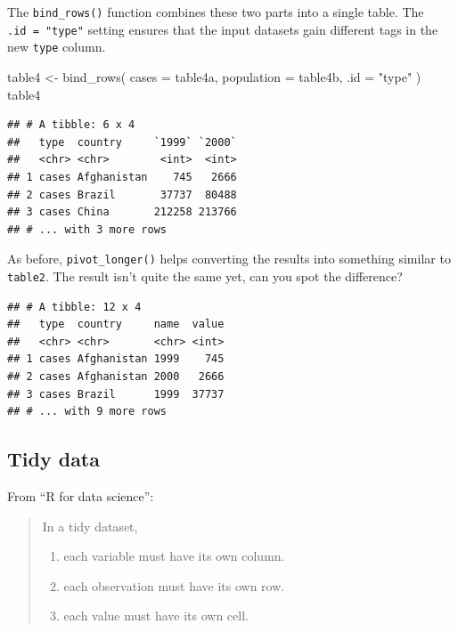 \documentclass[]{book}
\newenvironment{Shaded}{}{}
\newcommand{\DataTypeTok}[1]{#1}
\newcommand{\KeywordTok}[1]{\textcolor[rgb]{0.00,0.00,1.00}{#1}}
\newcommand{\NormalTok}[1]{#1}
\newcommand{\OperatorTok}[1]{#1}
\newcommand{\StringTok}[1]{\textcolor[rgb]{0.00,0.50,0.50}{#1}}
\providecommand{\tightlist}{%
  \setlength{\itemsep}{0pt}\setlength{\parskip}{0pt}}
\begin{document}
The \texttt{bind\_rows()} function combines these two parts into a single table.
The \texttt{.id\ =\ "type"} setting ensures that the input datasets gain different tags in the new \texttt{type} column.

\begin{Shaded}
\begin{Highlighting}[]
\NormalTok{table4 <-}
\StringTok{  }\KeywordTok{bind_rows}\NormalTok{(}
    \DataTypeTok{cases =}\NormalTok{ table4a,}
    \DataTypeTok{population =}\NormalTok{ table4b,}
    \DataTypeTok{.id =} \StringTok{"type"}
\NormalTok{  )}
\NormalTok{table4}
\end{Highlighting}
\end{Shaded}

\begin{verbatim}
## # A tibble: 6 x 4
##   type  country     `1999` `2000`
##   <chr> <chr>        <int>  <int>
## 1 cases Afghanistan    745   2666
## 2 cases Brazil       37737  80488
## 3 cases China       212258 213766
## # ... with 3 more rows
\end{verbatim}

As before, \texttt{pivot\_longer()} helps converting the results into something similar to \texttt{table2}.
The result isn't quite the same yet, can you spot the difference?

\begin{Shaded}
\end{Shaded}

\begin{verbatim}
## # A tibble: 12 x 4
##   type  country     name  value
##   <chr> <chr>       <chr> <int>
## 1 cases Afghanistan 1999    745
## 2 cases Afghanistan 2000   2666
## 3 cases Brazil      1999  37737
## # ... with 9 more rows
\end{verbatim}

\hypertarget{tidy-data}{%
\subsection{Tidy data}\label{tidy-data}}

From ``R for data science'':

\begin{quote}
In a tidy dataset,

\begin{enumerate}
\def\labelenumi{\arabic{enumi}.}
\tightlist
\item
  each variable must have its own column.
\item
  each observation must have its own row.
\item
  each value must have its own cell.
\end{enumerate}
\end{quote}
\end{document}
